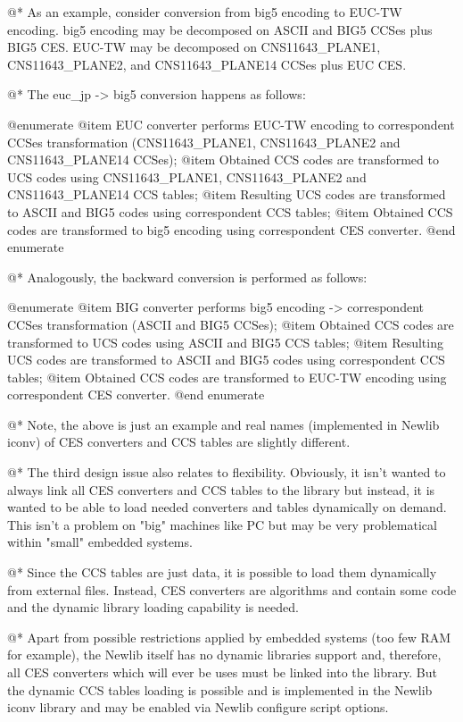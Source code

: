 @*
As an example, consider conversion from big5 encoding to EUC-TW
encoding. big5 encoding may be decomposed on ASCII and BIG5 CCSes plus
BIG5 CES. EUC-TW may be decomposed on CNS11643_PLANE1, CNS11643_PLANE2,
and CNS11643_PLANE14 CCSes plus EUC CES.

@*
The euc_jp -> big5 conversion happens as follows:

@enumerate
@item
EUC converter performs EUC-TW encoding to correspondent CCSes transformation
(CNS11643_PLANE1, CNS11643_PLANE2 and CNS11643_PLANE14 CCSes);
@item
Obtained CCS codes are transformed to UCS codes using CNS11643_PLANE1,
CNS11643_PLANE2 and CNS11643_PLANE14 CCS tables;
@item
Resulting UCS codes are transformed to ASCII and BIG5 codes using
correspondent CCS tables;
@item
Obtained CCS codes are transformed to big5 encoding using correspondent
CES converter.
@end enumerate

@*
Analogously, the backward conversion is performed as follows:

@enumerate
@item
BIG converter performs big5 encoding -> correspondent CCSes transformation
(ASCII and BIG5 CCSes);
@item
Obtained CCS codes are transformed to UCS codes using ASCII and BIG5 CCS tables;
@item
Resulting UCS codes are transformed to ASCII and BIG5 codes using
correspondent CCS tables;
@item
Obtained CCS codes are transformed to EUC-TW encoding using correspondent
CES converter.
@end enumerate

@*
Note, the above is just an example and real names (implemented in Newlib
iconv) of CES converters and CCS tables are slightly different.

@*
The third design issue also relates to flexibility. Obviously, it isn't
wanted to always link all CES converters and CCS tables to the library
but instead, it is wanted to be able to load needed converters and tables
dynamically on demand. This isn't a problem on "big" machines like PC
but may be very problematical within "small" embedded systems.

@*
Since the CCS tables are just data, it is possible to load them
dynamically from external files. Instead, CES converters are algorithms
and contain some code and the dynamic library loading capability is needed.

@*
Apart from possible restrictions applied by embedded systems (too few
RAM for example), the  Newlib itself  has no dynamic libraries support and,
therefore, all CES converters which will ever be uses must be linked into
the library. But the dynamic CCS tables loading is possible and is
implemented in the Newlib iconv library and may be enabled via Newlib
configure script options.

